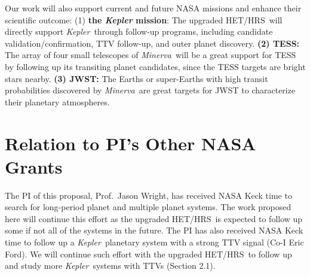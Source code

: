 \documentclass[12pt]{article}
\def\kepler{{\it Kepler}}
\def\minerva{{\it Minerva}}
\def\hrs{HET/HRS}
\begin{document}
Our work will also support current and future NASA missions and
enhance their scientific outcome: (1) {\bf the \textit{Kepler}
  mission}: The upgraded \hrs\ will directly support \kepler\ through
follow-up programs, including candidate validation/confirmation, TTV
follow-up, and outer planet discovery. {\bf (2) TESS:} The array of
four small telescopes of \minerva\ will be a great support for TESS by
following up its transiting planet candidates, since the TESS targets
are bright stars nearby. {\bf (3) JWST:} The Earths or super-Earths
with high transit probabilities discovered by \minerva\ are great
targets for JWST to characterize their planetary atmospheres.


\vspace{-3pt}
\section{Relation to PI's Other NASA Grants}

The PI of this proposal, Prof.~Jason Wright, has received NASA Keck
time to search for long-period planet and multiple planet systems. The
work proposed here will continue this effort as the upgraded \hrs\ is
expected to follow up some if not all of the systems in the future.
The PI has also received NASA Keck time to follow up a
\kepler\ planetary system with a strong TTV signal (Co-I Eric Ford). We
will continue such effort with the upgraded \hrs\ to follow up and
study more \kepler\ systems with TTVs (Section 2.1).


\vspace{-3pt}

\end{document}
